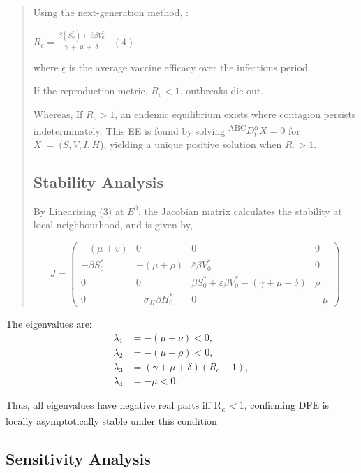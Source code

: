 \documentclass[10pt]{NSP1}
\begin{document}
\begin{quote}
Using the next-generation method, \cite{ref57}:

\(R_{c} = \frac{\beta\left( S_{0}^{*} \right) + \ \bar{\varepsilon}\beta V_{0}^{*}}{\gamma\  + \ \mu\  + \ \delta}\ \ \) \((4)\)

where \(\underline{\epsilon}\) is the average vaccine efficacy over the infectious period.

If the reproduction metric, \(R_{c} < 1\), outbreaks die out.

Whereas, If \(R_{c} > 1\), an endemic equilibrium exists where contagion persists indeterminately. This EE is found by solving \textsuperscript{ABC}\(D_{t}^{\alpha}X = 0\) for \(X\  = \ (S,V,I,H\)), yielding a unique positive solution when \(R_{c} > 1\).

\subsection{Stability Analysis}

By Linearizing (3) at \(E^{0}\), the Jacobian matrix calculates the stability at local neighbourhood, and is given by,

\[
J =
\begin{pmatrix}
	-(\mu + v) & 0 & 0 & 0 \\
	-\beta S_0^* & -(\mu + \rho) & \bar{\varepsilon}\beta V_0^* & 0 \\
	0 & 0 & \beta S_0^* + \bar{\varepsilon}\beta V_0^* - (\gamma + \mu + \delta) & \rho \\
	0 & -\sigma_H \beta H_0^* & 0 & -\mu
\end{pmatrix}
\]
\end{quote}

The eigenvalues are:
\begin{align*}
	\lambda_{1} &= -(\mu + \nu) < 0,\\
	\lambda_{2} &= -(\mu + \rho) < 0,\\
	\lambda_{3} &= (\gamma + \mu + \delta)(R_c - 1),\\
	\lambda_{4} &= -\mu < 0.
\end{align*}

Thus, all eigenvalues have negative real parts iff R\emph{\textsubscript{c} \textless{}} 1, confirming DFE is locally asymptotically stable under this condition

\subsection{Sensitivity Analysis}
\end{document}
